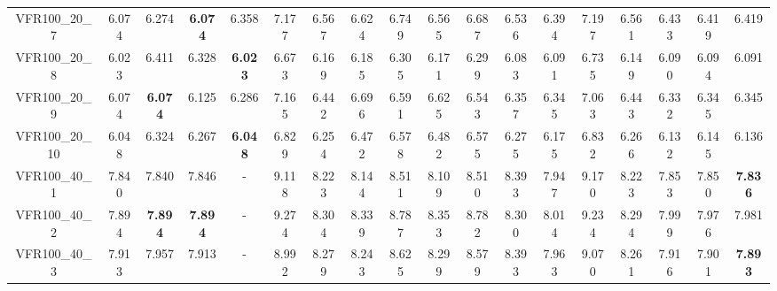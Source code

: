 \begin{tabular}{cc|ccc|ccccccccccccc}
VFR100\_20\_7      & 6.074            & 6.274            & {\bf 6.074}      & 6.358            & 7.177            & 6.567            & 6.624            & 6.749            & 6.565            & 6.687            & 6.536            & 6.394            & 7.197            & 6.561            & 6.433            & 6.419            & 6.419           \\ 
VFR100\_20\_8      & 6.023            & 6.411            & 6.328            & {\bf 6.023}      & 6.673            & 6.169            & 6.185            & 6.305            & 6.171            & 6.299            & 6.083            & 6.091            & 6.735            & 6.149            & 6.090            & 6.094            & 6.091           \\ 
VFR100\_20\_9      & 6.074            & {\bf 6.074}      & 6.125            & 6.286            & 7.165            & 6.442            & 6.696            & 6.591            & 6.625            & 6.543            & 6.357            & 6.345            & 7.063            & 6.443            & 6.332            & 6.345            & 6.345           \\ 
VFR100\_20\_10     & 6.048            & 6.324            & 6.267            & {\bf 6.048}      & 6.829            & 6.254            & 6.472            & 6.578            & 6.482            & 6.575            & 6.275            & 6.175            & 6.832            & 6.266            & 6.132            & 6.145            & 6.136           \\ 
VFR100\_40\_1      & 7.840            & 7.840            & 7.846            & -                & 9.118            & 8.223            & 8.144            & 8.511            & 8.109            & 8.510            & 8.393            & 7.947            & 9.170            & 8.223            & 7.853            & 7.850            & {\bf 7.836}     \\ 
VFR100\_40\_2      & 7.894            & {\bf 7.894}      & {\bf 7.894}      & -                & 9.274            & 8.304            & 8.339            & 8.787            & 8.353            & 8.782            & 8.300            & 8.014            & 9.234            & 8.294            & 7.999            & 7.976            & 7.981           \\ 
VFR100\_40\_3      & 7.913            & 7.957            & 7.913            & -                & 8.992            & 8.279            & 8.243            & 8.625            & 8.299            & 8.579            & 8.393            & 7.963            & 9.070            & 8.261            & 7.916            & 7.901            & {\bf 7.893}     \\ 

\end{tabular}
